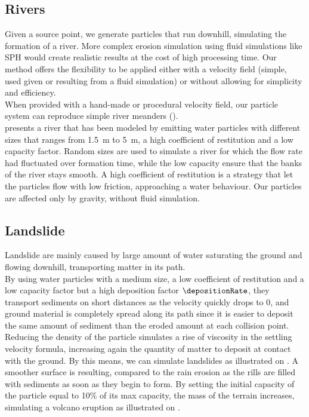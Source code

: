 \subsection{Rivers}
Given a source point, we generate particles that run downhill, simulating the formation of a river. More complex erosion simulation using fluid simulations like SPH \cite{Kristof2009} would create realistic results at the cost of high processing time. Our method offers the flexibility to be applied either with a velocity field (simple, used given or resulting from a fluid simulation) or without allowing for simplicity and efficiency.\\
When provided with a hand-made or procedural velocity field, our particle system can reproduce simple river meanders (). \\ 
 presents a river that has been modeled by emitting water particles with different sizes that ranges from \SI{1.5}{\meter} to \SI{5}{\meter}, a high coefficient of restitution and a low capacity factor. Random sizes are used to simulate a river for which the flow rate had fluctuated over formation time, while the low capacity ensure that the banks of the river stays smooth. A high coefficient of restitution is a strategy that let the particles flow with low friction, approaching a water behaviour. Our particles are affected only by gravity, without fluid simulation.

\subsection{Landslide}
Landslide are mainly caused by large amount of water saturating the ground and flowing downhill, transporting matter in its path. \\
By using water particles with a medium size, a low coefficient of restitution and a low capacity factor but a high deposition factor $\depositionRate$, they transport sediments on short distances as the velocity quickly drops to 0, and ground material is completely spread along its path since it is easier to deposit the same amount of sediment than the eroded amount at each collision point. Reducing the density of the particle simulates a rise of viscosity in the settling velocity formula, increasing again the quantity of matter to deposit at contact with the ground. By this means, we can simulate landslides as illustrated on . A smoother surface is resulting, compared to the rain erosion as the rills are filled with sediments as soon as they begin to form.
%
By setting the initial capacity of the particle equal to 10\% of its max capacity, the mass of the terrain increases, simulating a volcano eruption as illustrated on .


